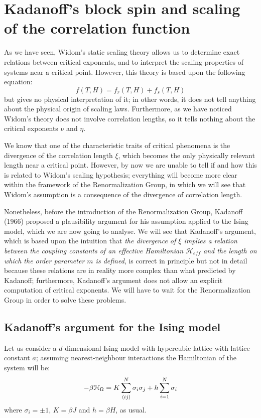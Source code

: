 \documentclass[../main/main.tex]{subfiles}
\begin{document}
\section{Kadanoff's block spin and scaling of the correlation function}
As we have seen, Widom's static scaling theory allows us to determine exact relations between critical exponents, and to interpret the scaling properties of systems near a critical point. However, this theory is based upon the following equation:
\begin{equation*}
  f (T,H) = f_r (T,H) + f_s(T,H)
\end{equation*}
but gives no physical interpretation of it; in other words, it does not tell anything about the physical origin of scaling laws. Furthermore, as we have noticed Widom's theory does not involve correlation lengths, so it tells nothing about the critical exponents \( \nu  \)  and \( \eta  \).


We know that one of the characteristic traits of critical phenomena is the divergence of the correlation length \( \xi  \), which becomes the only physically relevant length near a critical point. However, by now we are unable to tell if and how this is related to Widom's scaling hypothesis; everything will become more clear within the framework of the Renormalization Group, in which we will see that Widom's assumption is a consequence of the divergence of correlation length.

Nonetheless, before the introduction of the Renormalization Group, Kadanoff (1966) proposed a plausibility argument for his assumption applied to the Ising model, which we are now going to analyse. We will see that Kadanoff's argument, which is based upon the intuition that \emph{the divergence of \( \xi  \)  implies a relation between the coupling constants of an effective Hamiltonian \( \mathcal{H}_{eff} \) and the length on which the order parameter \( m \) is defined}, is correct in principle but not in detail because these relations are in reality more complex than what predicted by Kadanoff; furthermore, Kadanoff's argument does not allow an explicit computation of critical exponents. We will have to wait for the Renormalization Group in order to solve these problems.


\subsection{Kadanoff's argument for the Ising model}
Let us consider a \( d \)-dimensional  Ising model with hypercubic lattice with lattice constant \( a \); assuming nearest-neighbour interactions the Hamiltonian of the system will be:
\begin{equation}
  - \beta \mathcal{H}_{\Omega } = K \sum_{\expval{ij}}^{N} \sigma _i \sigma _j + h \sum_{i=1}^{N} \sigma _i
\end{equation}
where \( \sigma _i = \pm 1 \), \( K=\beta J \) and \( h=\beta H \), as usual.
\end{document}
